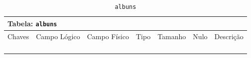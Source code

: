 \documentclass[12pt,a4paper]{article}
\begin{document}
\begin{center}
\begin{table}[h!]
	\caption{\texttt{albuns}}
	\label{tabela:albuns}
	\begin{tabular}{|p{1cm}|p{1.5cm}|p{1.25cm}|p{1.25cm}|p{1.75cm}|p{1.25cm}|p{4.5cm}|}\hline	
		\multicolumn{7}{|p{16cm}|}{\cellcolor{cinzaClaro}  \centering Tabela: \texttt{albuns}} \\ \hline %
		{\small Chaves} & {\small Campo Lógico} & {\small Campo Físico} & {\small Tipo} & {\small Tamanho} & {\small Nulo} & {\small Descrição}\\\hline %
		
		{\tiny } & {\tiny } & {\tiny } & {\tiny } & {\tiny } & {\tiny } &{\tiny }\\\hline
		{\tiny } & {\tiny } & {\tiny } & {\tiny } & {\tiny } & {\tiny } &{\tiny }\\\hline
		{\tiny } & {\tiny } & {\tiny } & {\tiny } & {\tiny } & {\tiny } &{\tiny }\\\hline
		{\tiny } & {\tiny } & {\tiny } & {\tiny } & {\tiny } & {\tiny } &{\tiny }\\\hline
		
			
	\end{tabular}
\end{table}	
\end{center}
\end{document}
